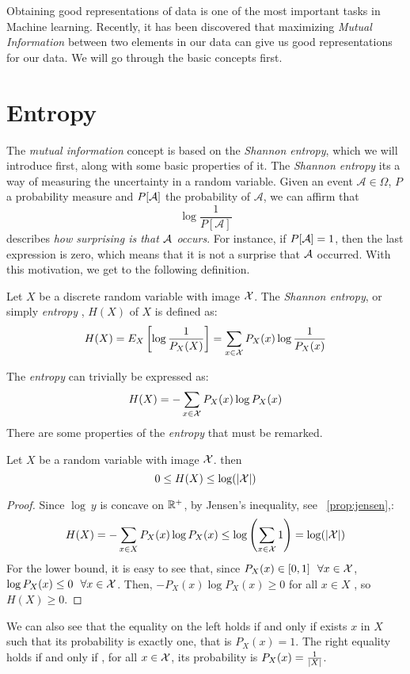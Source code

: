 Obtaining good representations of data is one of the most important tasks in Machine learning. 
Recently, it has been discovered that maximizing \emph{Mutual Information} between two elements in our data can give us good representations for our data. We will go through the basic concepts first.


\section{Entropy}

The \emph{mutual information} concept is based on the \emph{Shannon entropy}, which we will introduce first, along with some basic properties of it. The \emph{Shannon entropy} its a way of measuring the uncertainty in a random variable. Given an event $\mathcal A \in \Omega$, $P$ a probability measure and $P[\mathcal A]$ the probability of $\mathcal A$, we can affirm that 
$$
\log\frac{1}{P[\mathcal A]}
$$
describes \emph{how surprising is that $\mathcal A$ occurs}. For instance, if $P[\mathcal A] = 1$, then the last expression is zero, which means that it is not a surprise that $\mathcal A$ occurred. With this motivation, we get to the following definition.


\begin{ndef}
Let $X$ be a discrete random variable with image $\mathcal{X}$. The \emph{Shannon entropy}, or simply \emph{entropy} , $H(X)$ of $X$ is defined as:
$$
H(X) = E_X\left[\log\frac{1}{P_X(X)}\right] =  \sum_{x \in \mathcal{X}} P_X(x) \log\frac{1}{P_X(x)}
$$
\end{ndef}
The \emph{entropy} can trivially be expressed as:
$$
H(X) = - \sum_{x \in \mathcal{X}}P_X (x)\log P_X(x)
$$
There are some properties of the \emph{entropy} that must be remarked. 
\begin{nprop}\label{entr:prop:1}
    Let $X$ be a random variable with image $\mathcal{X}$. then
    $$
0 \leq H(X) \leq \log(|\mathcal{X}|)
    $$
\end{nprop}
\begin{proof}
    Since $\log \ y$ is concave on $\mathbb{R}^+$, by Jensen's inequality, see ~\cref{prop:jensen},:
    $$
    H(X) = - \sum_{x \in X}P_X (x)\log P_X(x) \leq \log\left(\sum_{x \in \mathcal{X}} 1\right) = \log(|\mathcal{X}|)
    $$
    For the lower bound, it is easy to see that, since $P_X(x) \in [0,1] \ \  \forall x \in \mathcal{X} $, $\log P_X(x) \leq 0 \ \ \forall x \in \mathcal{X}$. Then, $-P_X(x) \log P_X(x) \geq 0$ for all $x \in X$ , so $H(X) \geq 0$.
\end{proof}
We can also see that the equality on the left holds if and only if exists $ x $ in  $X$ such that its probability is exactly one, that is $P_X(x) = 1$. The right equality holds if and only if , for all $x \in \mathcal{X}$, its probability is $P_X(x) = \frac{1}{\lvert X\rvert}$.

